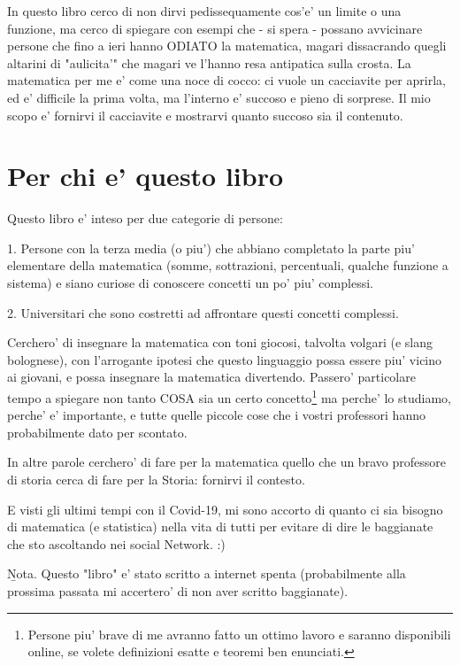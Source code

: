 In questo libro cerco di non dirvi pedissequamente cos'e' un limite o una funzione, ma cerco di spiegare con esempi che - si spera - possano avvicinare persone che fino a ieri 
hanno ODIATO la matematica, magari dissacrando quegli altarini di "aulicita'" che magari ve l'hanno resa antipatica sulla crosta. La matematica per me e' come una noce di cocco: ci 
vuole un cacciavite per aprirla, ed e' difficile la prima volta, ma l'interno e' succoso e pieno di sorprese. Il mio scopo e' fornirvi il cacciavite e mostrarvi quanto succoso sia il contenuto.

\section{Per chi e' questo libro}

Questo libro e' inteso per due categorie di persone: 

1. Persone con la terza media (o piu') che abbiano completato la parte piu' elementare della matematica (somme, sottrazioni, percentuali, qualche funzione a sistema) e siano
curiose di conoscere concetti un po' piu' complessi.

2. Universitari che sono costretti ad affrontare questi concetti complessi.

Cerchero' di insegnare la matematica con toni giocosi, talvolta volgari (e slang bolognese), con l'arrogante ipotesi che questo linguaggio possa essere piu' vicino ai giovani,
e possa insegnare la matematica divertendo. Passero' particolare tempo a spiegare non tanto COSA sia un certo concetto\footnote{Persone piu' brave di me avranno fatto un ottimo
lavoro e saranno disponibili online, se volete definizioni esatte e teoremi ben enunciati.} ma perche' lo studiamo, perche' e' importante, e tutte quelle piccole cose che i
vostri professori hanno probabilmente dato per scontato.

In altre parole cerchero' di fare per la matematica quello che un bravo professore di storia cerca di fare per la Storia: fornirvi il contesto.

E visti gli ultimi tempi con il Covid-19, mi sono accorto di quanto ci sia bisogno di matematica (e statistica) nella vita di tutti per evitare di dire le baggianate che sto ascoltando nei 
social Network. :)

\b{Nota}. Questo "libro" e' stato scritto a internet spenta (probabilmente alla prossima passata mi accertero' di non aver scritto baggianate).
